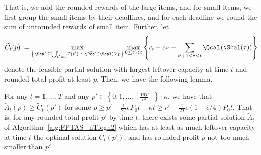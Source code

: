 That is, we add the rounded rewards of the large items, and for small items, we first group the small items by their deadlines, and for each deadline we round the sum of unrounded rewards of small item.
Further, let 
\[ \widetilde{C}_t(p) := \max_{\left\{\substack{
	\Scal \subseteq \bigcup_{t'=1}^t\mathcal{I}(t')\ :\  \tilde{\Pcal}(\Scal)\ge p}
\right\}} \max_{0 \leq t' < t}\left\{ c_t - c_{t'} - \sum_{t'+1 \leq \tau \leq  t} \Qcal(\Scal(\tau)) \right\} \]
denote the feasible partial solution with largest leftover capacity at time $t$ and rounded total profit at least $p$. Then, we have the following lemma.
\begin{lemma}\label{tilde2}
For any $t=1,\ldots,T$ and any $p'\in \left\{ 0, 1, \ldots,\left\lceil\frac{16T}{\epsilon^2}\right\rceil \right\} \cdot \kappa$, we have that $\widetilde{A}_t(p) \ge \widetilde{C}_t(p')$ for some $p\ge  p'-\frac{1}{2T}\epsilon P_0t - \kappa t \geq  r'- \frac{1}{2T}\epsilon (1-\epsilon/4) P_0t $.  %
That is, for any rounded total profit $p'$ by time $t$, there exists some partial solution $\widetilde{A}_t$ of Algorithm~\ref{alg:FPTAS_nTlogn2} which has at least as much leftover capacity at time $t$ the optimal solution $\widetilde{C}_t(p')$, and has rounded profit $p$ not too much smaller than $p'$.
\end{lemma}
